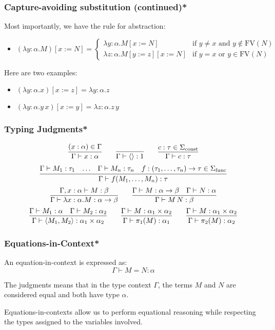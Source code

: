 \documentclass[aspectratio=169]{beamer}
\begin{document}
\begin{frame}
\frametitle{Capture-avoiding substitution (continued)*}

Most importantly, we have the rule for abstraction:

\begin{itemize}
    \item $(\lambda y : \alpha. M)[x := N] =
    \begin{cases}
    \lambda y : \alpha. M[x := N] & \text{if } y \neq x \text{ and } y \notin \text{FV}(N) \\
    \lambda z : \alpha. M[y := z][x := N] & \text{if } y = x \text{ or } y \in \text{FV}(N)
    \end{cases}$
\end{itemize}
\pause
Here are two examples:
\begin{itemize}
    \item $(\lambda y : \alpha. x)[x := z] = \lambda y : \alpha. z$
    \item $(\lambda y : \alpha. y \, x)[x := y] = \lambda z : \alpha. z \, y$
\end{itemize}

\end{frame}

\begin{frame}
\frametitle{Typing Judgments*}

\[
\infer{\Gamma \vdash x : \alpha}{(x : \alpha) \in \Gamma}
\qquad
\infer{\Gamma \vdash \langle \rangle : 1}{}
\qquad
\infer{\Gamma \vdash c : \tau}{c : \tau \in \Sigma_{\text{const}}}
\]
\pause
\[
\infer{\Gamma \vdash f(M_1, \ldots, M_n) : \tau}{\Gamma \vdash M_1 : \tau_1 & \ldots & \Gamma \vdash M_n : \tau_n & f : (\tau_1, \ldots, \tau_n) \rightarrow \tau \in \Sigma_{\text{func}}}
\]
\pause
\[
\infer{\Gamma \vdash \lambda x : \alpha. M : \alpha \rightarrow \beta}{\Gamma, x : \alpha \vdash M : \beta}
\qquad
\infer{\Gamma \vdash M \, N : \beta}{\Gamma \vdash M : \alpha \rightarrow \beta & \Gamma \vdash N : \alpha}
\]
\pause
\[
\infer{\Gamma \vdash \langle M_1, M_2 \rangle : \alpha_1 \times \alpha_2}{\Gamma \vdash M_1 : \alpha & \Gamma \vdash M_2 : \alpha_2}
\qquad
\infer{\Gamma \vdash \pi_1(M) : \alpha_1}{\Gamma \vdash M : \alpha_1 \times \alpha_2}
\qquad
\infer{\Gamma \vdash \pi_2(M) : \alpha_2}{\Gamma \vdash M : \alpha_1 \times \alpha_2}
\]
\end{frame}

\begin{frame}
\frametitle{Equations-in-Context*}

An equation-in-context is expressed as:
\[
\Gamma \vdash M = N : \alpha
\]

The judgments means that in the type context $\Gamma$, the terms $M$ and $N$ are considered equal and both have type $\alpha$.

\medskip

Equations-in-contexts allow us to perform equational reasoning while respecting the types assigned to the variables involved.

\end{frame}
\end{document}
